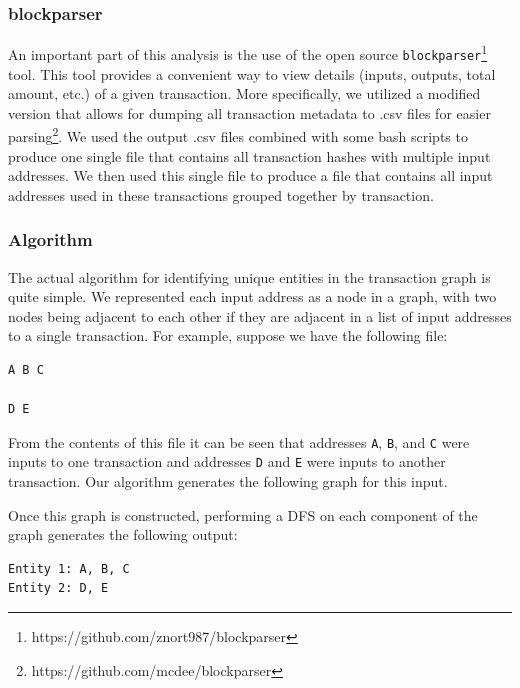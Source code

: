 \documentclass[11pt]{article}
\begin{document}
\subsubsection{blockparser}
An important part of this analysis is the use of the open source \texttt{blockparser}\footnote{https://github.com/znort987/blockparser} tool. This tool provides a convenient way to view details (inputs,
outputs, total amount, etc.) of a given transaction. More specifically, we utilized a modified version that allows for
dumping all transaction metadata to .csv files for easier parsing\footnote{https://github.com/mcdee/blockparser}. We
used the output .csv files combined with some bash scripts to produce one single file that contains all transaction
hashes with multiple input addresses. We then used this single file to produce a file that contains all input addresses
used in these transactions grouped together by transaction.

\subsubsection{Algorithm}
The actual algorithm for identifying unique entities in the transaction graph is quite simple.
We represented each input address as a node in a graph, with two nodes being adjacent to each other if they are adjacent
in a list of input addresses to a single transaction. For example, suppose we have the following file:
\begin{verbatim}
A B C

D E
\end{verbatim}

From the contents of this file it can be seen that addresses \texttt{A}, \texttt{B}, and \texttt{C} were inputs to one
transaction and addresses \texttt{D} and \texttt{E} were inputs to another transaction. Our algorithm generates the
following graph for this input.

\begin{center}
\end{center}

Once this graph is constructed, performing a DFS on each component of the graph generates the following output:
\begin{verbatim}
Entity 1: A, B, C
Entity 2: D, E
\end{verbatim}
\end{document}
